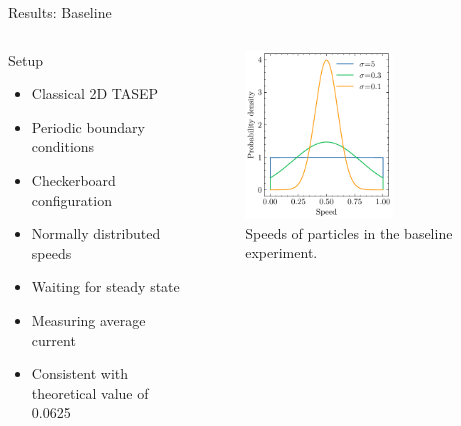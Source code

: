 \documentclass[10pt,xcolor=table, aspectratio=1610]{beamer}
\begin{document}
\begin{frame}{Results: Baseline}
  \begin{columns}
    \begin{block}{Setup}
      \begin{itemize}
        \item Classical 2D TASEP
        \item Periodic boundary conditions
        \item Checkerboard configuration
        \item<2-> Normally distributed speeds
        \item<3-> Waiting for steady state
        \item<4-> Measuring average current
        \item<4-> Consistent with theoretical value of 0.0625
      \end{itemize}
    \end{block}
    \begin{overprint}
    \begin{figure}
      \includegraphics[width=0.65\textwidth]{../Thesis/img/results/truncated_normal.pdf}
      \caption*{\hspace{0.175\textwidth} Speeds of particles in the baseline experiment.}
    \end{figure}
    \begin{figure}

\end{figure}
\end{overprint}
\end{columns}
\end{frame}
\end{document}
